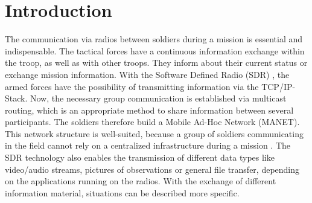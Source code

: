 \documentclass[conference]{IEEEtran}
\newcommand{\MANET}{MANET}
\begin{document}
\section{Introduction}\label{sec:Introduction}
%
	The communication via radios between soldiers during a mission is essential and indispensable. The tactical forces have a continuous information exchange within the troop, as well as with other troops. They inform about their current status or exchange mission information. With the Software Defined Radio (SDR) \cite{SDR}, the armed forces have the possibility of transmitting information via the TCP/IP-Stack. Now, the necessary group communication is established via multicast routing, which is an appropriate method to share information between several participants. The soldiers therefore build a Mobile Ad-Hoc Network (\MANET{}). This network structure is well-suited, because a group of soldiers communicating in the field cannot rely on a centralized infrastructure during a mission \cite{military:manet}. The SDR technology also enables the transmission of different data types like video/audio streams, pictures of observations or general file transfer, depending on the  applications running on the radios. With the exchange of different information material, situations can be described more specific.
	
\end{document}

